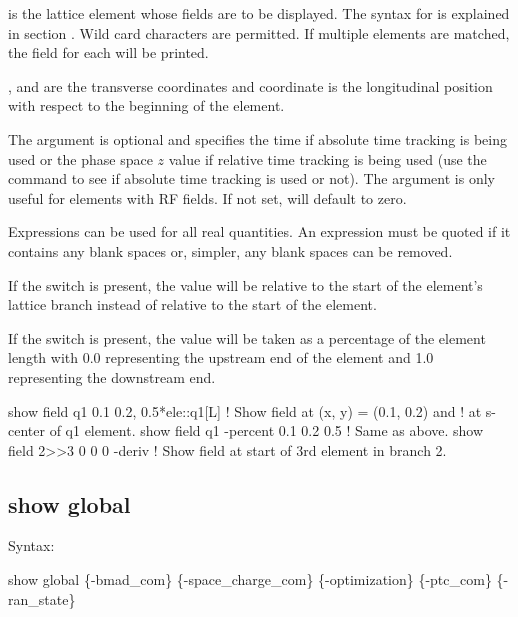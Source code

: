 {{{{{{{{ is the lattice element whose fields are to be displayed. The syntax for  is
explained in section . Wild card characters are permitted. If multiple
elements are matched, the field for each will be printed.

, and  are the transverse coordinates and  coordinate is the longitudinal
position with respect to the beginning of the element. 

The  argument is optional and specifies the time if absolute time tracking is being
used or the phase space $z$ value if relative time tracking is being used (use the  command to see if absolute time tracking is used or not). The  argument is
only useful for elements with RF fields. If not set,  will default to zero.

Expressions can be used for all real quantities. An expression must be quoted if it contains any
blank spaces or, simpler, any blank spaces can be removed.

If the  switch is present, the  value will be relative to the start
of the element's lattice branch instead of relative to the start of the element.

If the  switch is present, the  value will be taken as a percentage
of the element length with 0.0 representing the upstream end of the element and 1.0 representing
the downstream end.

\begin{example}
  show field q1 0.1  0.2, 0.5*ele::q1[L]  ! Show field at (x, y) = (0.1, 0.2) and 
                                          !    at s-center of q1 element.
  show field q1 -percent 0.1  0.2 0.5     ! Same as above.
  show field 2>>3 0 0 0 -deriv            ! Show field at start of 3rd element in branch 2.
\end{example}


\subsection{show global}
\label{s:show.global}

Syntax:
\begin{example}
  show global \{-bmad_com\} \{-space_charge_com\} \{-optimization\} \{-ptc_com\} \{-ran_state\} 
\end{example}

}}}}}}}}
